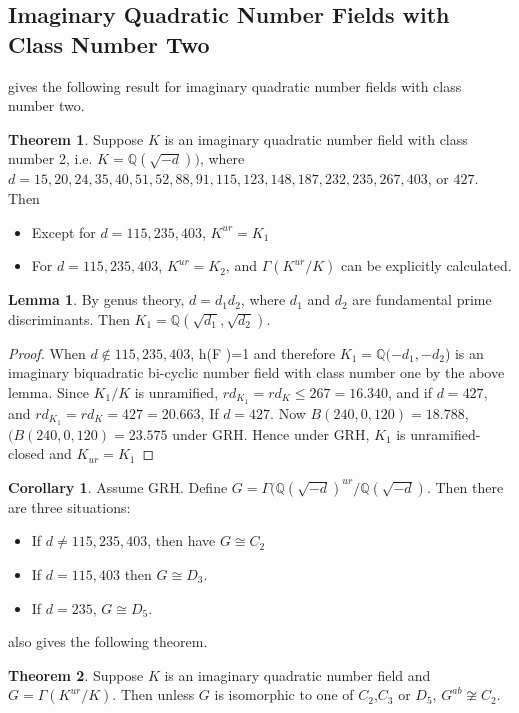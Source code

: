 \documentclass[12pt]{extarticle}
\newcommand{\Q}{\mathbb{Q}}
\newcommand{\<}{\langle}
\renewcommand{\>}{\rangle}
\theoremstyle{definition}
\newtheorem{theorem}{Theorem}
\newtheorem{corollary}{Corollary}
\newtheorem{lemma}{Lemma}
\begin{document}
\subsection{Imaginary Quadratic Number Fields with Class Number Two}
\cite{YAMAMURA1996} gives the following result for imaginary quadratic number fields with class number two.
\begin{theorem}
Suppose $K$ is an imaginary quadratic number field with class number 2, i.e. $K=\Q(\sqrt{-d}))$, where $d= 15, 20, 24, 35, 40, 51, 52, 88, 91, 115, 123, 148, 187, 232, 235, 267, 403$, or $427$. Then \begin{itemize}
\item Except for $d = 115, 235, 403$, $K^{ur} = K_1$
\item For $d = 115, 235, 403$,  $K^{ur} = K_2$, and $\Gamma(K^{ur}/K)$ can be explicitly calculated. 
\end{itemize}
\end{theorem}
\begin{lemma}
By genus theory, $d= d_1d_2$, where $d_1$ and $d_2$ are fundamental prime discriminants. Then $K_1 = \Q(\sqrt{d_1},\sqrt{d_2})$. 
\end{lemma}
\begin{proof}
When $d \not \in {115, 235, 403}$, h(F )=1 and therefore 
$K_1 =\Q(- d_1, - d_2 $) is an imaginary biquadratic bi-cyclic number field with class number one by the above lemma. Since $K_1/K$ is unramified,  $rd_{K_1}=rd_K \leq 267=16.340$, and  if $d = 427$, and $rd_{K_1}=rd_K = 427=20.663$, If $d=427$. Now  $B(240, 0, 120) = 18.788$, $(B(240, 0, 120) = 23.575$ under GRH. Hence under GRH, $K_1$ is unramified-closed and $K_{ur}=K_1$ 
\end{proof}
\begin{corollary}
Assume GRH. Define $G = \Gamma(\Q(\sqrt{-d})^{ur}/\Q(\sqrt{-d})$. Then there are three situations:
\begin{itemize}
\item If $d \neq 115, 235, 403$, then have $ G \cong C_2$
\item If $d = 115,403$ then $G \cong D_3$.
\item If $d =  235$, $G \cong D_5$. 
\end{itemize}
\end{corollary}

\cite{YAMAMURA1996} also gives the following theorem. 
\begin{theorem}
Suppose $K$ is an imaginary quadratic number field and $G = \Gamma(K^{ur}/K)$.  Then unless $G$ is isomorphic to one of $C_2$,$C_3$ or $D_5$, $G^{ab} \not \cong C_2$. 
\end{theorem}
\end{document}

